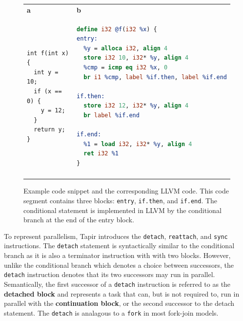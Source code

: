 \documentclass[sigconf]{acmart}
\newcommand{\figlabel}[1]   {\label{fig:#1}}
\newcommand{\subfiglabel}[1]    {\textbf{#1}}
\def\code{\lstinline[basicstyle=\ttfamily\color{CodeColor}]}
\begin{document}
\begin{figure}[h!]
  \begin{tabular*}{\linewidth}{@{\extracolsep{\fill}}ll}

    \subfiglabel{a} & \subfiglabel{b} \\
\begin{minipage}[T]{0.45\linewidth}
      \begin{lstlisting}
int f(int x) {
  int y = 10;
  if (x == 0) {
    y = 12;
  }
  return y;
}
      \end{lstlisting}
    \end{minipage}
&
    \begin{minipage}[T]{0.45\linewidth}
\begin{lstlisting}[language=llvm]
define i32 @f(i32 %x) {
entry:
  %y = alloca i32, align 4
  store i32 10, i32* %y, align 4
  %cmp = icmp eq i32 %x, 0
  br i1 %cmp, label %if.then, label %if.end

if.then:
  store i32 12, i32* %y, align 4
  br label %if.end

if.end:
  %1 = load i32, i32* %y, align 4
  ret i32 %1
}
\end{lstlisting}
    \end{minipage}\\
    \addlinespace[2ex]
    \bottomrule
  \end{tabular*}
  \caption{Example code snippet and the corresponding LLVM code. This code segment contains three blocks: \code{entry}, \code{if.then}, and \code{if.end}. The conditional statement is implemented in LLVM by the conditional branch at the end of the entry block. }
  \figlabel{CFG}
  \vspace{-.4cm}
\end{figure}

To represent parallelism, Tapir introduces the \code{detach}, \code{reattach}, and
\code{sync} instructions. The \code{detach} statement is syntactically similar to
the conditional branch as it is also a terminator instruction with with two blocks.
However, unlike the conditional branch which denotes a choice between successors, the \code{detach} instruction denotes that its two successors may run in parallel. Semantically,
the first successor of a \code{detach} instruction is referred to as the \textbf{detached block} and represents a task that can, but is not required to, run in parallel with the
\textbf{continuation block}, or the second successor to the detach statement. The \code{detach}
is analagous to a \code{fork} in most fork-join models.
\end{document}
